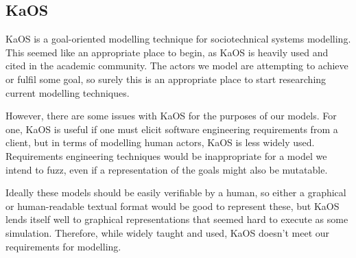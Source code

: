 \subsection{KaOS} %
KaOS is a goal-oriented modelling technique for sociotechnical systems modelling\cite{Werneck2009}. This seemed like an appropriate place to begin, as KaOS is heavily used and cited in the academic community. The actors we model are attempting to achieve or fulfil some goal, so surely this is an appropriate place to start researching current modelling techniques.\par%
However, there are some issues with KaOS for the purposes of our models. For one, KaOS is useful if one must elicit software engineering requirements from a client, but in terms of modelling human actors, KaOS is less widely used. Requirements engineering techniques would be inappropriate for a model we intend to fuzz, even if a representation of the goals might also be mutatable. \par 
Ideally these models should be easily verifiable by a human, so either a graphical or human-readable textual format would be good to represent these, but KaOS lends itself well to graphical representations that seemed hard to execute as some simulation. Therefore, while widely taught and used, KaOS doesn't meet our requirements for modelling. \par

